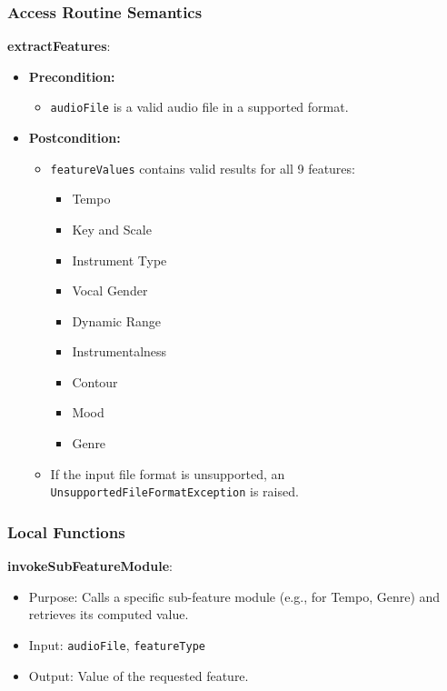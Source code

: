 \documentclass[12pt, titlepage]{article}
\begin{document}
\subsubsection{Access Routine Semantics}
\textbf{extractFeatures}:
\begin{itemize}
    \item \textbf{Precondition:} 
    \begin{itemize}
        \item \texttt{audioFile} is a valid audio file in a supported format.
    \end{itemize}
    \item \textbf{Postcondition:}
    \begin{itemize}
        \item \texttt{featureValues} contains valid results for all 9 features:
            \begin{itemize}
                \item Tempo
                \item Key and Scale
                \item Instrument Type
                \item Vocal Gender
                \item Dynamic Range
                \item Instrumentalness
                \item Contour
                \item Mood
                \item Genre
            \end{itemize}
        \item If the input file format is unsupported, an \texttt{UnsupportedFileFormatException} is raised.
    \end{itemize}
\end{itemize}

\subsubsection{Local Functions}
\textbf{invokeSubFeatureModule}:
\begin{itemize}
    \item Purpose: Calls a specific sub-feature module (e.g., for Tempo, Genre) and retrieves its computed value.
    \item Input: \texttt{audioFile}, \texttt{featureType}
    \item Output: Value of the requested feature.
\end{itemize}
\end{document}
